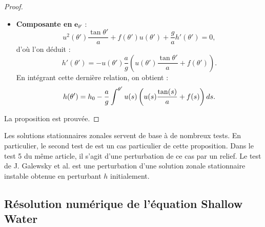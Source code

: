 \begin{proof}
\begin{itemize}
\item \textbf{Composante en} $\mathbf{e}_{\theta'}$ :
\begin{equation}
u^2 (\theta') \dfrac{\tan \theta'}{a}  + f(\theta') u(\theta') + \dfrac{g}{a} h'(\theta') = 0,
\end{equation}
d'où l'on déduit :
\begin{equation}
h'(\theta') = - u(\theta') \dfrac{a}{g} \left( u(\theta') \dfrac{\tan \theta'}{a} + f(\theta') \right).
\end{equation}
En intégrant cette dernière relation, on obtient :
\begin{equation}
h(\theta') = h_0 - \dfrac{a}{g} \displaystyle\int^{\theta'} u(s) \left( u(s) \dfrac{\tan (s)}{a} + f(s) \right) ds.
\end{equation}
\end{itemize}
La proposition est prouvée.
\end{proof}

Les solutions stationnaires zonales servent de base à de nombreux tests. En particulier, le second test de \cite{Williamson1992} est un cas particulier de cette proposition. Dans le test 5 du même article, il s'agit d'une perturbation de ce cas par un relief.
Le test de J. Galewsky et al. \cite{Galewsky2004} est une perturbation d'une solution zonale stationnaire instable obtenue en perturbant $h$ initialement.































\subsection{Résolution numérique de l'équation Shallow Water}

